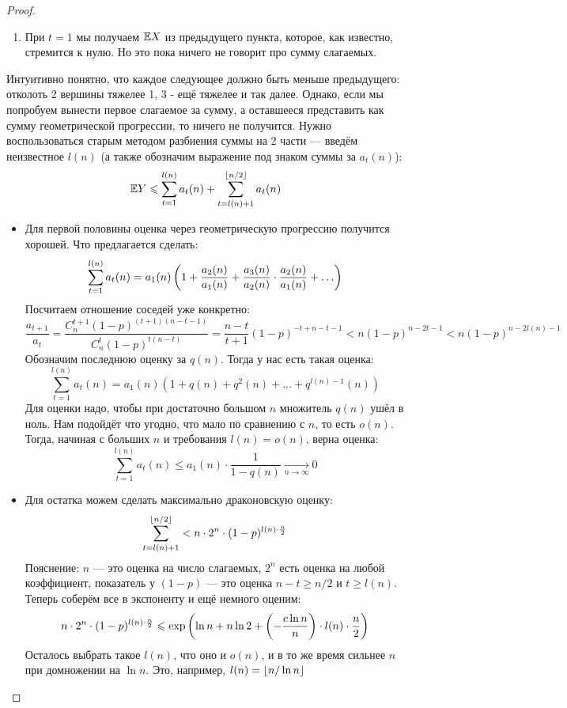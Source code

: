 \begin{proof}
\begin{enumerate}
\begin{enumerate}
			\item При $t = 1$ мы получаем $\mathbb{E} X$ из предыдущего пункта, которое, как известно, стремится к нулю. Но это пока ничего не говорит про сумму слагаемых.
		\end{enumerate}
		Интуитивно понятно, что каждое следующее должно быть меньше предыдущего: отколоть 2 вершины тяжелее 1, 3 - ещё тяжелее и так далее. Однако, если мы попробуем вынести первое слагаемое за сумму, а оставшееся представить как сумму геометрической прогрессии, то ничего не получится. Нужно воспользоваться старым методом разбиения суммы на 2 части --- введём неизвестное $l(n)$ (а также обозначим выражение под знаком суммы за $a_t(n)$):
		\[
			\mathbb{E} Y \leqslant \sum_{t = 1}^{l(n)} a_t(n) + \sum_{t = l(n) + 1}^{\left\lfloor n / 2 \right\rfloor} a_t(n)
		\]
		\begin{itemize}
			\item Для первой половины оценка через геометрическую прогрессию получится хорошей. Что предлагается сделать:
			\[
				\sum_{t = 1}^{l(n)} a_t(n) = a_1(n)\left(1 + \frac{a_2(n)}{a_1(n)} + \frac{a_3(n)}{a_2(n)} \cdot \frac{a_2(n)}{a_1(n)} + \ldots\right)
			\]
			Посчитаем отношение соседей уже конкретно:
			\[
				\frac{a_{t + 1}}{a_t} = \frac{C_n^{t + 1}(1 - p)^{(t + 1)(n - t - 1)}}{C_n^t(1 - p)^{t(n - t)}} = \frac{n - t}{t + 1} (1 - p)^{-t + n - t - 1} < n(1 - p)^{n - 2t - 1} < n(1 - p)^{n - 2l(n) - 1}
			\]
			Обозначим последнюю оценку за $q(n)$. Тогда у нас есть такая оценка:
			\[
				\sum_{t = 1}^{l(n)} a_t(n) = a_1(n)(1 + q(n) + q^2(n) + \ldots + q^{l(n) - 1}(n))
			\]
			Для оценки надо, чтобы при достаточно большом $n$ множитель $q(n)$ ушёл в ноль. Нам подойдёт что угодно, что мало по сравнению с $n$, то есть $o(n)$. Тогда, начиная с больших $n$ и требования $l(n) = o(n)$, верна оценка:
			\[
				\sum_{t = 1}^{l(n)} a_t(n) \le a_1(n) \cdot \frac{1}{1 - q(n)} \xrightarrow[n \to \infty]{} 0
			\]
			
			\item Для остатка можем сделать максимально драконовскую оценку:
			\[
				\sum_{t = l(n) + 1}^{\left\lfloor n / 2 \right\rfloor} < n \cdot 2^n \cdot (1 - p)^{l(n) \cdot \frac{n}{2}}
			\]
			Пояснение: $n$ --- это оценка на число слагаемых, $2^n$ есть оценка на любой коэффициент, показатель у $(1 - p)$ --- это оценка $n - t \ge n / 2$ и $t \ge l(n)$. Теперь соберём все в экспоненту и ещё немного оценим:
			\[
				n \cdot 2^n \cdot (1 - p)^{l(n) \cdot \frac{n}{2}} \leqslant \exp\left(\ln n + n\ln 2 + \left(-\frac{c\ln n}{n}\right) \cdot l(n) \cdot \frac{n}{2}\right)
			\]
			Осталось выбрать такое $l(n)$, что оно и $o(n)$, и в то же время сильнее $n$ при домножении на $\ln n$. Это, например, $l(n) = \left\lfloor n / \ln n \right\rfloor$
		\end{itemize}
	\end{enumerate}
\end{proof}

